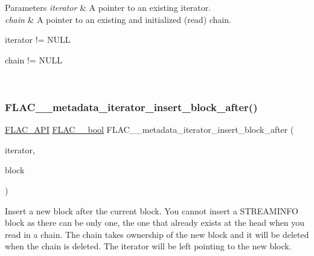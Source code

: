 \begin{DoxyParams}{Parameters}
{\em iterator} & A pointer to an existing iterator. \\
\hline
{\em chain} & A pointer to an existing and initialized (read) chain.  
\begin{DoxyCode}
iterator != NULL 
\end{DoxyCode}
 
\begin{DoxyCode}
chain != NULL 
\end{DoxyCode}
 \\
\hline
\end{DoxyParams}
\mbox{\label{group__flac__metadata__level2_ga2f9d8e02bd2e5ffb235af0b02d347d47}} 
\subsubsection{\texorpdfstring{F\+L\+A\+C\+\_\+\+\_\+metadata\+\_\+iterator\+\_\+insert\+\_\+block\+\_\+after()}{FLAC\_\_metadata\_iterator\_insert\_block\_after()}}
{\footnotesize\ttfamily \hyperlink{group__flac__export_ga56ca07df8a23310707732b1c0007d6f5}{F\+L\+A\+C\+\_\+\+A\+PI} \hyperlink{ordinals_8h_a95103469f1cbd78b8cf250194985b34e}{F\+L\+A\+C\+\_\+\+\_\+bool} F\+L\+A\+C\+\_\+\+\_\+metadata\+\_\+iterator\+\_\+insert\+\_\+block\+\_\+after (\begin{DoxyParamCaption}\item[{\hyperlink{group__flac__metadata__level2_ga9f3e135a07cdef7e51597646aa7b89b2}{F\+L\+A\+C\+\_\+\+\_\+\+Metadata\+\_\+\+Iterator} $\ast$}]{iterator,  }\item[{\hyperlink{struct_f_l_a_c_____stream_metadata}{F\+L\+A\+C\+\_\+\+\_\+\+Stream\+Metadata} $\ast$}]{block }\end{DoxyParamCaption})}

Insert a new block after the current block. You cannot insert a S\+T\+R\+E\+A\+M\+I\+N\+FO block as there can be only one, the one that already exists at the head when you read in a chain. The chain takes ownership of the new block and it will be deleted when the chain is deleted. The iterator will be left pointing to the new block.


